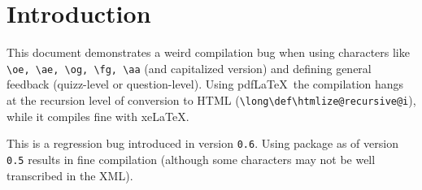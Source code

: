 \documentclass{article}
\begin{document}
\section*{Introduction}

This document demonstrates a weird compilation bug when using characters like 
\verb|\oe, \ae, \og, \fg, \aa| (and capitalized version) and defining general 
feedback (quizz-level or question-level). Using pdf\LaTeX\ the compilation 
hangs at the recursion level of conversion to HTML 
(\verb|\long\def\htmlize@recursive@i|), while it compiles fine with xe\LaTeX.

This is a regression bug introduced in version \texttt{0.6}. Using package as 
of version \texttt{0.5} results in fine compilation (although some characters 
may not be well transcribed in the XML).
\end{document}
